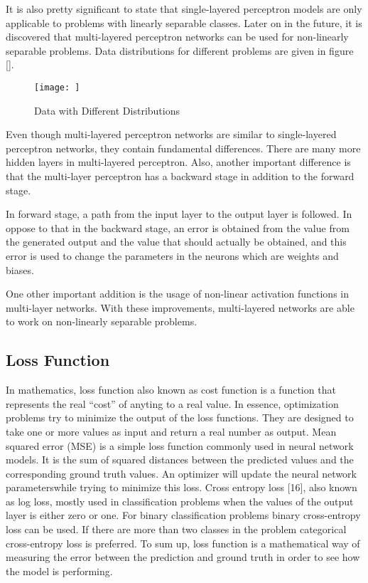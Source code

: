 It is also pretty significant to state that single-layered perceptron models are only applicable to problems with linearly separable classes. Later on in the future, it is discovered that multi-layered perceptron networks can be used for non-linearly separable problems. Data distributions for different problems are given in figure [].

\begin{figure}[h]
    \centering
    \texttt{[image: ]}
    \caption{Data with Different Distributions}
    \label{fig:my_label}
\end{figure}

Even though multi-layered perceptron networks are similar to single-layered perceptron networks, they contain fundamental differences. There are many more hidden layers in multi-layered perceptron. Also, another important difference is that the multi-layer perceptron has a backward stage in addition to the forward stage.

In forward stage, a path from the input layer to the output layer is followed. In oppose to that in the backward stage, an error is obtained from the value from the generated output and the value that should actually be obtained, and this error is used to change the parameters in the neurons which are weights and biases.

One other important addition is the usage of non-linear activation functions in multi-layer networks. With these improvements, multi-layered networks are able to work on non-linearly separable problems.

\subsection{Loss Function}

In mathematics, loss function also known as cost function is a function that represents the real “cost” of anyting to a real value. In essence, optimization problems try to minimize the output of the loss functions. They are designed to take one or more values as input and return a real number as output. Mean squared error (MSE) is a simple loss function commonly used in neural network models. It is the sum of squared distances between the predicted values and the corresponding ground truth values. An optimizer will update the neural network parameterswhile trying to minimize this loss. Cross entropy loss [16], also known as log loss, mostly used in classification problems when the values of the output layer is either zero or one. For binary classification problems binary cross-entropy loss can be used. If there are more than two classes in the problem categorical cross-entropy loss is preferred. To sum up, loss function is a mathematical way of measuring the error between the prediction and ground truth in order to see how the model is performing.

